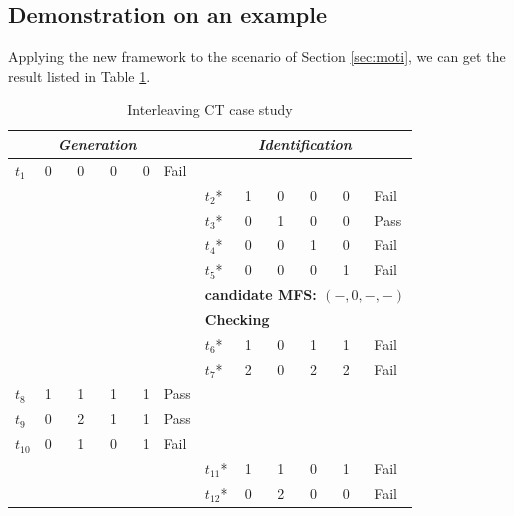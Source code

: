 \documentclass[10pt,journal,compsoc]{IEEEtran}
\begin{document}
\subsection{Demonstration on an example}\label{sec:app:example}

Applying the new framework to the scenario of Section \ref{sec:moti},  we can get the result listed in Table \ref{new-gi}.
\begin{table}[ht]
\caption{Interleaving CT case study}
\label{new-gi}
\centering
\begin{tabular}{llllll|llllll}
\hline
 & \multicolumn{4}{c}{\bfseries \emph{Generation}}& & \multicolumn{6}{c}{\bfseries \emph{Identification}} \\
 \hline
$t_{1}$ & \multicolumn{4}{l}{0 \ \ \ 0 \ \ \ 0  \ \ \  0 } & Fail & \multicolumn{6}{l}{}\\
\multicolumn{5}{l}{}& & $t_{2}$* &\multicolumn{4}{l}{1  \ \ \  0 \ \ \  0 \ \ \  0 }& Fail \\
\multicolumn{5}{l}{}& &$t_{3}$* &\multicolumn{4}{l}{0  \ \ \   1 \ \ \  0 \ \ \  0} & Pass \\
\multicolumn{5}{l}{}& &$t_{4}$* &\multicolumn{4}{l}{0  \ \ \   0 \ \ \   1 \ \ \  0} & Fail \\
\multicolumn{5}{l}{}& &$t_{5}$* &\multicolumn{4}{l}{0  \ \ \   0 \ \ \   0 \ \ \   1} & Fail \\
\multicolumn{5}{l}{}& &\multicolumn{6}{l}{ \bfseries{candidate MFS}: $(-, 0, - , -)$ }  \\
\multicolumn{5}{l}{}& &\multicolumn{6}{l}{ \bfseries{\textbf{Checking}} }  \\
\multicolumn{5}{l}{}& &$t_{6}$* &\multicolumn{4}{l}{1  \ \ \   0 \ \ \   1 \ \ \  1} & Fail \\
\multicolumn{5}{l}{}& &$t_{7}$* &\multicolumn{4}{l}{2  \ \ \   0 \ \ \   2 \ \ \   2} & Fail \\
$t_{8}$ &\multicolumn{4}{l}{1 \ \ \ 1 \ \ \ 1  \ \ \  1 } & Pass & \multicolumn{6}{l}{}\\
$t_{9}$ &\multicolumn{4}{l}{0 \ \ \ 2 \ \ \ 1  \ \ \  1 } & Pass & \multicolumn{6}{l}{}\\
$t_{10}$ &\multicolumn{4}{l}{0  \ \ \ 1 \ \ \ 0  \ \ \  1 } & Fail & \multicolumn{6}{l}{}\\
\multicolumn{5}{l}{}& & $t_{11}$* &\multicolumn{4}{l}{1  \ \ \  1 \ \ \  0 \ \ \  1 }& Fail \\
\multicolumn{5}{l}{}& &$t_{12}$* &\multicolumn{4}{l}{0  \ \ \  2 \ \ \  0 \ \ \  0} & Fail \\

\end{tabular}
\end{table}
\end{document}
